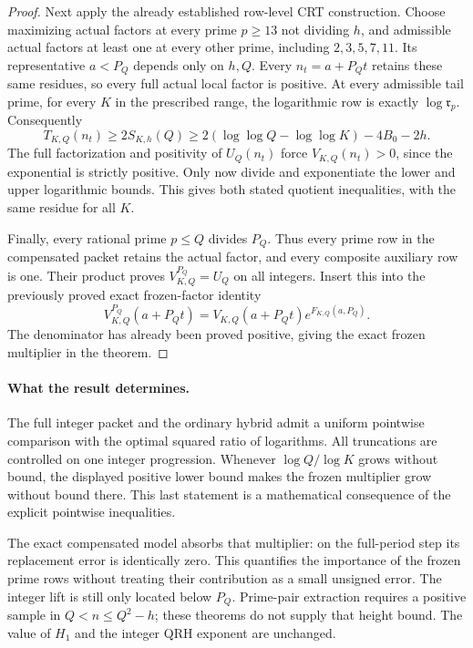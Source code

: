 \documentclass[11pt]{article}
\begin{document}
\begin{proof}
Next apply the already established row-level CRT construction.
Choose maximizing actual factors at every prime \(p\geq13\) not
dividing \(h\), and admissible actual factors at least one at every
other prime, including \(2,3,5,7,11\).
Its representative \(a<P_Q\) depends only on \(h,Q\).
Every \(n_t=a+P_Qt\) retains these same residues, so every full actual
local factor is positive. At every admissible tail prime, for
every \(K\) in the prescribed range, the logarithmic row is exactly
\(\log\mathfrak r_p\). Consequently
\[
 T_{K,Q}(n_t)
 \geq2S_{K,h}(Q)
 \geq2(\log\log Q-\log\log K)-4B_0-2h.
\]
The full factorization and positivity of \(U_Q(n_t)\) force
\(V_{K,Q}(n_t)>0\), since the exponential is strictly positive.
Only now divide and exponentiate the lower and upper logarithmic
bounds. This gives both stated quotient inequalities, with the same
residue for all \(K\).

Finally, every rational prime \(p\leq Q\) divides \(P_Q\).
Thus every prime row in the compensated packet retains the actual
factor, and every composite auxiliary row is one. Their product
proves \(V^{P_Q}_{K,Q}=U_Q\) on all integers.
Insert this into the previously proved exact frozen-factor identity
\[
 V^{P_Q}_{K,Q}(a+P_Qt)
          =V_{K,Q}(a+P_Qt)e^{F_{K,Q}(a,P_Q)}.
\]
The denominator has already been proved positive, giving the exact
frozen multiplier in the theorem.
\end{proof}

\paragraph{What the result determines.}
The full integer packet and the ordinary hybrid admit a uniform
pointwise comparison with the optimal squared ratio of logarithms.
All truncations are controlled on one integer progression.
Whenever \(\log Q/\log K\) grows without bound, the displayed positive
lower bound makes the frozen multiplier grow without bound there.
This last statement is a mathematical consequence of the explicit
pointwise inequalities.

The exact compensated model absorbs that multiplier: on the full-period
step its replacement error is identically zero. This quantifies the
importance of the frozen prime rows without treating their contribution
as a small unsigned error.
The integer lift is still only located below \(P_Q\).
Prime-pair extraction requires a positive sample in
\(Q<n\leq Q^2-h\); these theorems do not supply that height bound.
The value of \(H_1\) and the integer QRH exponent are unchanged.
\end{document}
